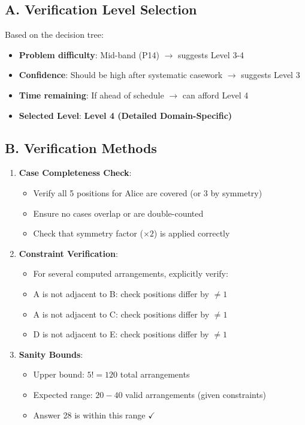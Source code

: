 \documentclass[]{article}
\begin{document}
\begin{verificationbox}
\subsection*{A. Verification Level Selection}
Based on the decision tree:
\begin{itemize}[leftmargin=*]
    \item \textbf{Problem difficulty}: Mid-band (P14) $\rightarrow$ suggests Level 3-4
    \item \textbf{Confidence}: Should be high after systematic casework $\rightarrow$ suggests Level 3
    \item \textbf{Time remaining}: If ahead of schedule $\rightarrow$ can afford Level 4
    \item \textbf{Selected Level}: \textbf{Level 4 (Detailed Domain-Specific)}
\end{itemize}

\subsection*{B. Verification Methods}
\begin{enumerate}[leftmargin=*]
    \item \textbf{Case Completeness Check}:
    \begin{itemize}
        \item Verify all 5 positions for Alice are covered (or 3 by symmetry)
        \item Ensure no cases overlap or are double-counted
        \item Check that symmetry factor ($\times 2$) is applied correctly
    \end{itemize}
    
    \item \textbf{Constraint Verification}:
    \begin{itemize}
        \item For several computed arrangements, explicitly verify:
        \item A is not adjacent to B: check positions differ by $\neq 1$
        \item A is not adjacent to C: check positions differ by $\neq 1$
        \item D is not adjacent to E: check positions differ by $\neq 1$
    \end{itemize}
    
    \item \textbf{Sanity Bounds}:
    \begin{itemize}
        \item Upper bound: $5! = 120$ total arrangements
        \item Expected range: $20-40$ valid arrangements (given constraints)
        \item Answer 28 is within this range $\checkmark$
    \end{itemize}
    

\end{enumerate}
\end{verificationbox}
\end{document}
